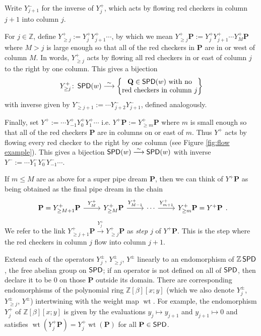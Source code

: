 \documentclass[11pt,reqno]{amsart} %
\newcommand{\bbZ}{\mathbb{Z}}
\newcommand{\bfP}{\mathbf{P}}
\newcommand{\bfQ}{\mathbf{Q}}
\DeclareMathOperator{\wt}{wt}
\DeclareMathOperator{\SPD}{\sf{SPD}}
\theoremstyle{definition}
\begin{document}
Write $Y^-_{j+1}$ for the inverse of $Y^+_j$, which acts by flowing red checkers in column $j+1$ into column $j$.

For $j\in \bbZ$, define $Y^+_{\geq j} := Y^+_jY^+_{j+1}\cdots$, by which we mean $Y^+_{\geq j}\bfP := Y^+_jY^+_{j+1}\cdots Y^+_M\bfP$ where $M > j$ is large enough so that all of the red checkers in $\bfP$ are in or west of column $M$.
In words, $Y^+_{\geq j}$ acts by flowing all red checkers in or east of column $j$ to the right by one column.
This gives a bijection \[
    Y^+_{\geq j}\colon
    \SPD(w)
    \overset\sim\longrightarrow
    \left\{\begin{tabular}{@{} c @{}}
        $\bfQ\in \SPD(w)$ \text{with no} \\
        red checkers in column $j$
    \end{tabular}\right\}
\] with inverse given by $Y^-_{\geq j+1} := \cdots Y^-_{j+2}Y^-_{j+1}$, defined analogously.

Finally, set $Y^+ := \cdots Y^+_{-1} Y^+_0 Y^+_1\cdots$ i.e. $Y^+\bfP := Y^+_{\geq m}\bfP$ where $m$ is small enough so that all of the red checkers $\bfP$ are in columns on or east of $m$.
Thus $Y^+$ acts by flowing every red checker to the right by one column (see Figure \ref{fig:flow example}).
This gives a bijection $\SPD(w) \overset\sim\longrightarrow \SPD(w)$ with inverse $Y^- := \cdots Y^-_1 Y^-_0 Y^-_{-1} \cdots$.

If $m\leq M$ are as above for a super pipe dream $\bfP$, then we can think of $Y^+\bfP$ as being obtained as the final pipe dream in the chain \[
\begin{tikzcd}
    \bfP = Y^+_{\geq M+1}\bfP \arrow[r, "Y^+_M"]
    & Y^+_{\geq M}\bfP \arrow[r,"Y^+_{M-1}"]
    & \cdots \arrow[r,"Y^+_{m+1}"]
    & Y^+_{\geq m} \bfP = Y^+\bfP
\end{tikzcd}.
\]
We refer to the link $Y^+_{\geq j+1}\bfP \overset{Y^+_j}\longrightarrow Y^+_{\geq j}\bfP$ as \textit{step $j$} of $Y^+\bfP$.
This is the step where the red checkers in column $j$ flow into column $j+1$.

Extend each of the operators $Y^\pm_j$, $Y^\pm_{\geq j}$, $Y^\pm$ linearly to an endomorphism of $\bbZ\SPD$, the free abelian group on $\SPD$; if an operator is not defined on all of $\SPD$, then declare it to be $0$ on those $\bfP$ outside its domain.
There are corresponding endomorphisms of the polynomial ring $\bbZ[\beta][x;y]$ (which we also denote $Y^\pm_j$, $Y^\pm_{\geq j}$, $Y^\pm$) intertwining with the weight map $\wt$.
For example, the endomorphism $Y^+_j$ of $\bbZ[\beta][x;y]$ is given by the evaluations $y_j \mapsto y_{j+1}$ and $y_{j+1}\mapsto 0$ and satisfies $\wt(Y^+_j\bfP) = Y^+_j\wt(\bfP)$ for all $\bfP\in \SPD$.
\end{document}
